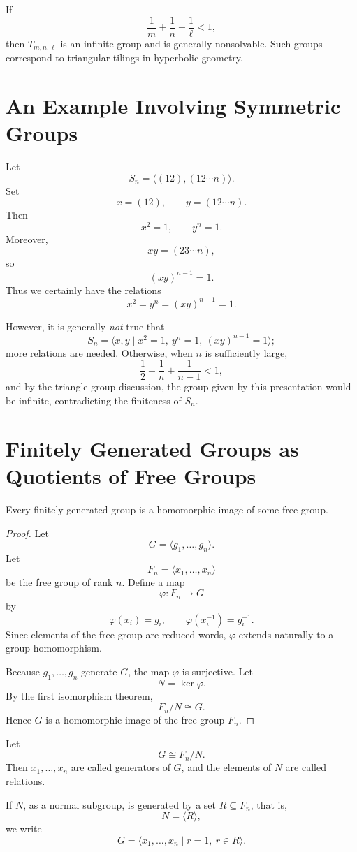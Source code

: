 If
\[
\frac1m+\frac1n+\frac1\ell<1,
\]
then \(T_{m,n,\ell}\) is an infinite group and is generally nonsolvable. Such groups correspond to triangular tilings in hyperbolic geometry.

\section{An Example Involving Symmetric Groups}

\begin{example}
Let
\[
S_n=\langle (12),(12\cdots n)\rangle.
\]
Set
\[
x=(12),\qquad y=(12\cdots n).
\]
Then
\[
x^2=1,\qquad y^n=1.
\]
Moreover,
\[
xy=(23\cdots n),
\]
so
\[
(xy)^{n-1}=1.
\]
Thus we certainly have the relations
\[
x^2=y^n=(xy)^{n-1}=1.
\]

However, it is generally \emph{not} true that
\[
S_n
=
\langle x,y\mid x^2=1,\ y^n=1,\ (xy)^{n-1}=1\rangle;
\]
more relations are needed. Otherwise, when \(n\) is sufficiently large,
\[
\frac12+\frac1n+\frac1{n-1}<1,
\]
and by the triangle-group discussion, the group given by this presentation would be infinite, contradicting the finiteness of \(S_n\).
\end{example}

\section{Finitely Generated Groups as Quotients of Free Groups}

\begin{theorem}
Every finitely generated group is a homomorphic image of some free group.
\end{theorem}

\begin{proof}
Let
\[
G=\langle g_1,\dots,g_n\rangle.
\]
Let
\[
F_n=\langle x_1,\dots,x_n\rangle
\]
be the free group of rank \(n\). Define a map
\[
\varphi\colon F_n\longrightarrow G
\]
by
\[
\varphi(x_i)=g_i,\qquad
\varphi(x_i^{-1})=g_i^{-1}.
\]
Since elements of the free group are reduced words, \(\varphi\) extends naturally to a group homomorphism.

Because \(g_1,\dots,g_n\) generate \(G\), the map \(\varphi\) is surjective. Let
\[
N=\ker\varphi.
\]
By the first isomorphism theorem,
\[
F_n/N\cong G.
\]
Hence \(G\) is a homomorphic image of the free group \(F_n\).
\end{proof}

\begin{definition}
Let
\[
G\cong F_n/N.
\]
Then \(x_1,\dots,x_n\) are called generators of \(G\), and the elements of \(N\) are called relations.

If \(N\), as a normal subgroup, is generated by a set \(R\subseteq F_n\), that is,
\[
N=\langle R\rangle,
\]
we write
\[
G=\langle x_1,\dots,x_n\mid r=1,\ r\in R\rangle.
\]
\end{definition}

